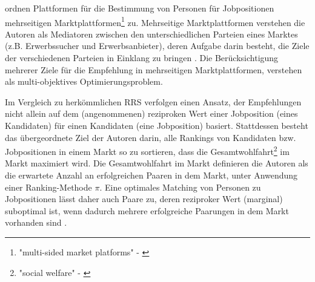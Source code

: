 

\textcite[S. 329]{su:inproceedings} ordnen Plattformen für die Bestimmung von Personen für Jobpositionen mehrseitigen Marktplattformen\footnote{"multi-sided market platforms" - \textcite[S. 329]{su:inproceedings}} zu.
Mehrseitige Marktplattformen verstehen die Autoren als Mediatoren zwischen den unterschiedlichen Parteien eines Marktes (z.B. Erwerbssucher und Erwerbsanbieter), deren Aufgabe darin besteht, die Ziele der verschiedenen Parteien in Einklang zu bringen \cite[S. 329]{su:inproceedings}.
Die Berücksichtigung mehrerer Ziele für die Empfehlung in mehrseitigen Marktplattformen, verstehen \textcite[S. 329]{su:inproceedings} als multi-objektives Optimierungsproblem.

Im Vergleich zu herkömmlichen \ac{RRS} verfolgen \textcite[S. 328ff.]{su:inproceedings} einen Ansatz, der Empfehlungen nicht allein auf dem (angenommenen) reziproken Wert einer Jobposition (eines Kandidaten) für einen Kandidaten (eine Jobposition) basiert.
Stattdessen besteht das übergeordnete Ziel der Autoren darin, alle Rankings von Kandidaten bzw. Jobpositionen in einem Markt so zu sortieren, dass die Gesamtwohlfahrt\footnote{"social welfare" - \textcite[S. 329]{su:inproceedings}} im Markt maximiert wird.
Die Gesamtwohlfahrt im Markt definieren die Autoren als die erwartete Anzahl an erfolgreichen Paaren in dem Markt, unter Anwendung einer Ranking-Methode $\pi$.
Eine optimales Matching von Personen zu Jobpositionen lässt daher auch Paare zu, deren reziproker Wert (marginal) suboptimal ist, wenn dadurch mehrere erfolgreiche Paarungen in dem Markt vorhanden sind \cite[S. 334]{su:inproceedings}.

